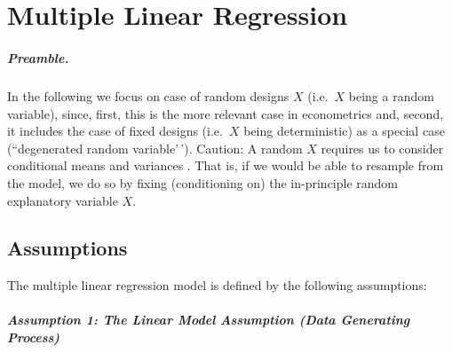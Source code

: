 \documentclass[
  14pt,
]{memoir}
\begin{document}
\hypertarget{ch:MLR}{%
\chapter{Multiple Linear Regression}\label{ch:MLR}}

\paragraph*{Preamble.}

In the following we focus on case of random designs \(X\) (i.e.~\(X\) being a random variable),
since, first, this is the more relevant case in econometrics and, second, it includes the case of
fixed designs (i.e.~\(X\) being deterministic) as a special case (``degenerated random variable'\,').
Caution: A random \(X\) requires us to consider conditional means and variances .
That is, if we would be able to resample from the model, we do so by fixing (conditioning on)
the in-principle random explanatory variable \(X\).

\hypertarget{assumptions}{%
\section{Assumptions}\label{assumptions}}

The multiple linear regression model is defined by the following assumptions:

\paragraph*{Assumption 1: The Linear Model Assumption (Data Generating Process)}
\end{document}
